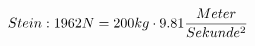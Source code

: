 \documentclass[preview]{standalone}
\begin{document}
\begin{align*}
\special{dvisvgm:raw <g id='unique000'>}Stein: 1962N = 200 kg \cdot 9.81 \frac{Meter}{Sekunde^{2}}\special{dvisvgm:raw </g>}
\end{align*}
\end{document}
